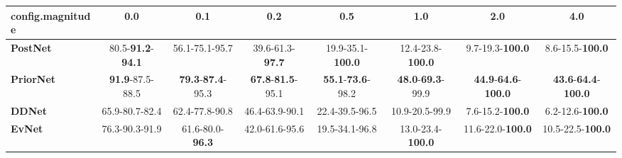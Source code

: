 \begin{tabular}{lccccccc}
\toprule
\textbf{config.magnitude} &                               0.0 &                               0.1 &                               0.2 &                               0.5 &                               1.0 &                                         2.0 &                                         4.0 \\
\midrule
\textbf{PostNet } &  80.5-\textbf{91.2}-\textbf{94.1} &                    56.1-75.1-95.7 &           39.6-61.3-\textbf{97.7} &          19.9-35.1-\textbf{100.0} &          12.4-23.8-\textbf{100.0} &                     9.7-19.3-\textbf{100.0} &                     8.6-15.5-\textbf{100.0} \\
\textbf{PriorNet} &           \textbf{91.9}-87.5-88.5 &  \textbf{79.3}-\textbf{87.4}-95.3 &  \textbf{67.8}-\textbf{81.5}-95.1 &  \textbf{55.1}-\textbf{73.6}-98.2 &  \textbf{48.0}-\textbf{69.3}-99.9 &  \textbf{44.9}-\textbf{64.6}-\textbf{100.0} &  \textbf{43.6}-\textbf{64.4}-\textbf{100.0} \\
\textbf{DDNet   } &                    65.9-80.7-82.4 &                    62.4-77.8-90.8 &                    46.4-63.9-90.1 &                    22.4-39.5-96.5 &                    10.9-20.5-99.9 &                     7.6-15.2-\textbf{100.0} &                     6.2-12.6-\textbf{100.0} \\
\textbf{EvNet   } &                    76.3-90.3-91.9 &           61.6-80.0-\textbf{96.3} &                    42.0-61.6-95.6 &                    19.5-34.1-96.8 &          13.0-23.4-\textbf{100.0} &                    11.6-22.0-\textbf{100.0} &                    10.5-22.5-\textbf{100.0} \\
\bottomrule
\end{tabular}

